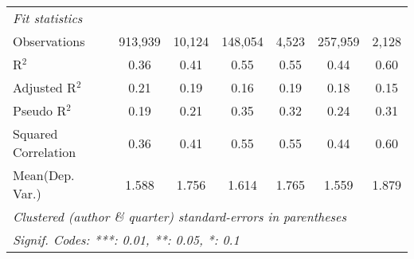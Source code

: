 \begin{tabular}{lcccccc}
   \midrule
   \emph{Fit statistics}\\
   Observations                                               & 913,939        & 10,124        & 148,054       & 4,523   & 257,959        & 2,128\\  
   R$^2$                                                      & 0.36           & 0.41          & 0.55          & 0.55    & 0.44           & 0.60\\  
   Adjusted R$^2$                                             & 0.21           & 0.19          & 0.16          & 0.19    & 0.18           & 0.15\\  
   Pseudo R$^2$                                               & 0.19           & 0.21          & 0.35          & 0.32    & 0.24           & 0.31\\  
   Squared Correlation                                        & 0.36           & 0.41          & 0.55          & 0.55    & 0.44           & 0.60\\  
Mean(Dep. Var.) & 1.588 & 1.756 & 1.614 & 1.765 & 1.559 & 1.879 \\
   \midrule \midrule
   \multicolumn{7}{l}{\emph{Clustered (author \& quarter) standard-errors in parentheses}}\\
   \multicolumn{7}{l}{\emph{Signif. Codes: ***: 0.01, **: 0.05, *: 0.1}}\\
\end{tabular}
\par\endgroup
